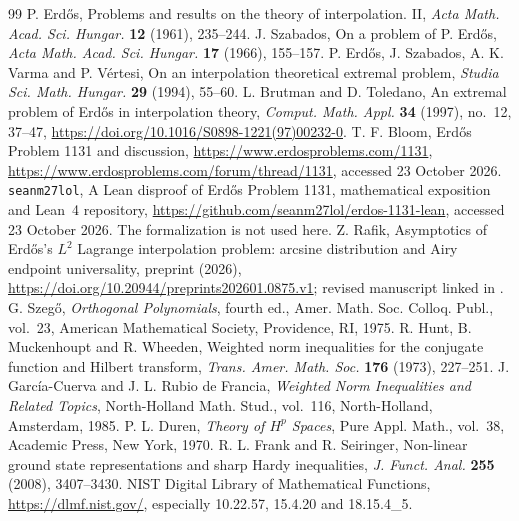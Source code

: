 \documentclass[a4paper,11pt]{amsart}
\theoremstyle{remark}\newtheorem{remark}[theorem]{Remark}
\begin{document}
\begin{thebibliography}{99}
 P. Erd\H{o}s, Problems and results on the theory of
interpolation. II, \emph{Acta Math. Acad. Sci. Hungar.} \textbf{12}
(1961), 235--244.
 J. Szabados, On a problem of P. Erd\H{o}s,
\emph{Acta Math. Acad. Sci. Hungar.} \textbf{17} (1966), 155--157.
 P. Erd\H{o}s, J. Szabados, A. K. Varma and P. V\'ertesi,
On an interpolation theoretical extremal problem,
\emph{Studia Sci. Math. Hungar.} \textbf{29} (1994), 55--60.
 L. Brutman and D. Toledano, An extremal problem of
Erd\H{o}s in interpolation theory, \emph{Comput. Math. Appl.}
\textbf{34} (1997), no.~12, 37--47,
\url{https://doi.org/10.1016/S0898-1221(97)00232-0}.
 T. F. Bloom, Erd\H{o}s Problem 1131 and discussion,
\url{https://www.erdosproblems.com/1131},
\url{https://www.erdosproblems.com/forum/thread/1131},
accessed 23 October 2026.
 \texttt{seanm27lol}, A Lean disproof of Erd\H{o}s
Problem 1131, mathematical exposition and Lean~4 repository,
\url{https://github.com/seanm27lol/erdos-1131-lean},
accessed 23 October 2026. The formalization is not used here.
 Z. Rafik, Asymptotics of Erd\H{o}s's $L^2$ Lagrange
interpolation problem: arcsine distribution and Airy endpoint
universality, preprint (2026),
\url{https://doi.org/10.20944/preprints202601.0875.v1};
revised manuscript linked in \cite{bloom}.
 G. Szeg\H{o}, \emph{Orthogonal Polynomials},
fourth ed., Amer. Math. Soc. Colloq. Publ., vol.~23,
American Mathematical Society, Providence, RI, 1975.
 R. Hunt, B. Muckenhoupt and R. Wheeden,
Weighted norm inequalities for the conjugate function and Hilbert
transform, \emph{Trans. Amer. Math. Soc.} \textbf{176} (1973),
227--251.
 J. Garc\'ia-Cuerva and J. L. Rubio de Francia,
\emph{Weighted Norm Inequalities and Related Topics},
North-Holland Math. Stud., vol.~116, North-Holland, Amsterdam, 1985.
 P. L. Duren, \emph{Theory of $H^p$ Spaces},
Pure Appl. Math., vol.~38, Academic Press, New York, 1970.
 R. L. Frank and R. Seiringer, Non-linear ground state
representations and sharp Hardy inequalities,
\emph{J. Funct. Anal.} \textbf{255} (2008), 3407--3430.
 NIST Digital Library of Mathematical Functions,
\url{https://dlmf.nist.gov/}, especially 10.22.57, 15.4.20 and 18.15.4\_5.
\end{thebibliography}
\end{document}
